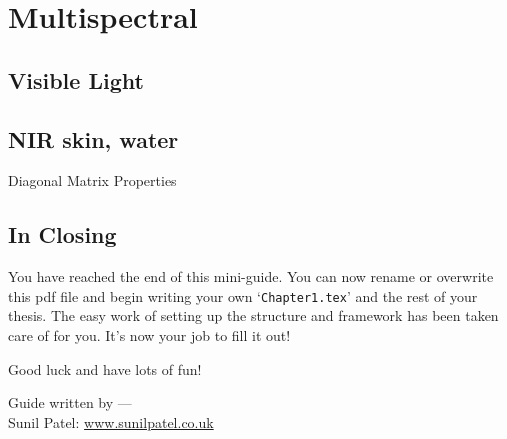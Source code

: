 \chapter{Multispectral} %

\label{Chapter7} %


\section{Visible Light}
\section{NIR skin, water}

\begin{compactitem}

\item Diagonal Matrix Properties
\end{compactitem}


\section{In Closing}

You have reached the end of this mini-guide. You can now rename or overwrite this pdf file and begin writing your own `\texttt{Chapter1.tex}' and the rest of your thesis. The easy work of setting up the structure and framework has been taken care of for you. It's now your job to fill it out!

Good luck and have lots of fun!

\begin{flushright}
Guide written by ---\\
Sunil Patel: \href{http://www.sunilpatel.co.uk}{www.sunilpatel.co.uk}
\end{flushright}
